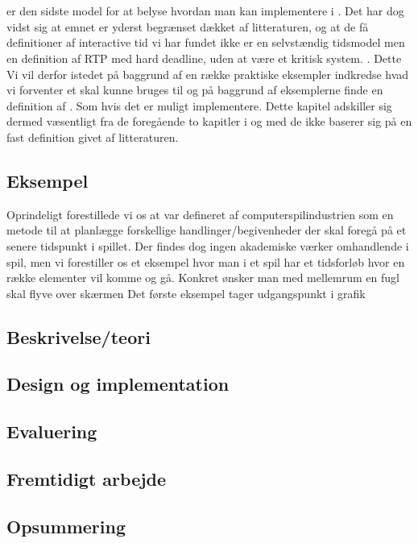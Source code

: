 \chapter{\is}
\label{chap:is}

\is er den sidste model for at belyse hvordan man kan implementere i \pycsp. Det har dog vidst sig at emnet er yderst begrænset dækket af litteraturen, og at de få definitioner af interactive tid vi har fundet ikke er en selvstændig tidsmodel men en definition af RTP med hard deadline, uden at være et kritisk system. \cite{?}. Dette Vi vil derfor istedet på baggrund af en række praktiske eksempler indkredse hvad vi forventer et \is skal kunne bruges til og på  baggrund af eksemplerne finde en definition af \is. Som hvis det er muligt implementere. Dette kapitel adskiller sig dermed væsentligt fra de foregående to kapitler i og med de ikke baserer sig på en fast definition givet af litteraturen. 

  \section{Eksempel}
Oprindeligt forestillede vi os at \is var defineret af computerspilindustrien som en metode til at planlægge forskellige handlinger/begivenheder der skal foregå på et senere tidspunkt i spillet. Der findes dog ingen akademiske værker omhandlende \is i spil, men vi forestiller os et eksempel hvor man i et spil har et tidsforløb hvor en række elementer vil komme og gå. Konkret ønsker man med mellemrum en fugl skal flyve over skærmen Det første eksempel tager udgangspunkt i grafik

  \section{Beskrivelse/teori}
  \section{Design og implementation}
  \section{Evaluering}
  \section{Fremtidigt arbejde}
  \section{Opsummering}
